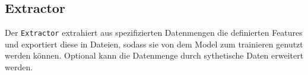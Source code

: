 \subsection{Extractor}
Der \texttt{Extractor} extrahiert aus spezifizierten Datenmengen die definierten Features und exportiert diese in Dateien, sodass sie von dem Model zum trainieren genutzt werden können. Optional kann die Datenmenge durch
sythetische Daten erweitert werden.